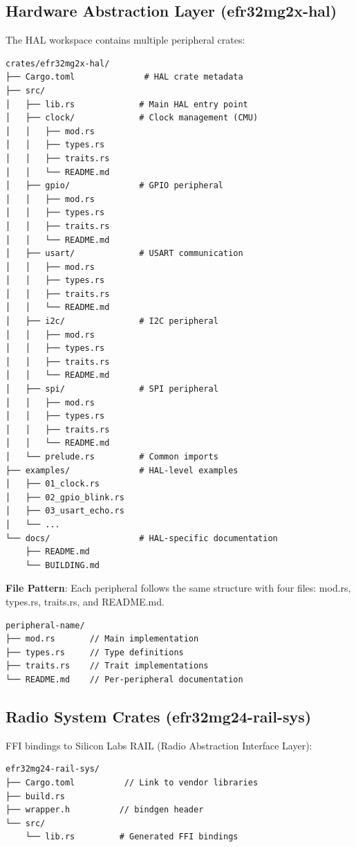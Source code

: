 \subsection{Hardware Abstraction Layer (efr32mg2x-hal)}

The HAL workspace contains multiple peripheral crates:

\begin{verbatim}
crates/efr32mg2x-hal/
├── Cargo.toml              # HAL crate metadata
├── src/
│   ├── lib.rs             # Main HAL entry point
│   ├── clock/             # Clock management (CMU)
│   │   ├── mod.rs
│   │   ├── types.rs
│   │   ├── traits.rs
│   │   └── README.md
│   ├── gpio/              # GPIO peripheral
│   │   ├── mod.rs
│   │   ├── types.rs
│   │   ├── traits.rs
│   │   └── README.md
│   ├── usart/             # USART communication
│   │   ├── mod.rs
│   │   ├── types.rs
│   │   ├── traits.rs
│   │   └── README.md
│   ├── i2c/               # I2C peripheral
│   │   ├── mod.rs
│   │   ├── types.rs
│   │   ├── traits.rs
│   │   └── README.md
│   ├── spi/               # SPI peripheral
│   │   ├── mod.rs
│   │   ├── types.rs
│   │   ├── traits.rs
│   │   └── README.md
│   └── prelude.rs         # Common imports
├── examples/              # HAL-level examples
│   ├── 01_clock.rs
│   ├── 02_gpio_blink.rs
│   ├── 03_usart_echo.rs
│   └── ...
└── docs/                  # HAL-specific documentation
    ├── README.md
    └── BUILDING.md
\end{verbatim}

\textbf{File Pattern}: Each peripheral follows the same structure with four files: mod.rs, types.rs, traits.rs, and README.md.

\begin{verbatim}
peripheral-name/
├── mod.rs       // Main implementation
├── types.rs     // Type definitions
├── traits.rs    // Trait implementations
└── README.md    // Per-peripheral documentation
\end{verbatim}

\subsection{Radio System Crates (efr32mg24-rail-sys)}

FFI bindings to Silicon Labs RAIL (Radio Abstraction Interface Layer):

\begin{verbatim}
efr32mg24-rail-sys/
├── Cargo.toml          // Link to vendor libraries
├── build.rs
├── wrapper.h          // bindgen header
└── src/
    └── lib.rs         # Generated FFI bindings
\end{verbatim}

